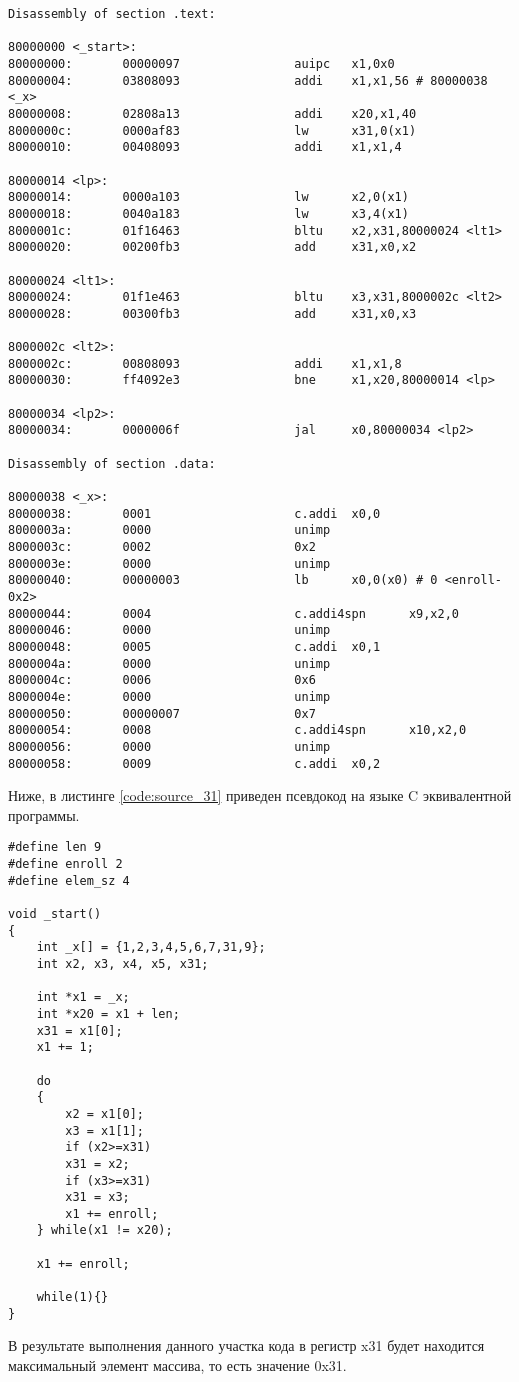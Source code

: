 \newpage
\begin{lstlisting}[label=code:source_21, caption=Деассемблированный листинг исходной программы]
Disassembly of section .text:

80000000 <_start>:
80000000:       00000097                auipc   x1,0x0
80000004:       03808093                addi    x1,x1,56 # 80000038 <_x>
80000008:       02808a13                addi    x20,x1,40
8000000c:       0000af83                lw      x31,0(x1)
80000010:       00408093                addi    x1,x1,4

80000014 <lp>:
80000014:       0000a103                lw      x2,0(x1)
80000018:       0040a183                lw      x3,4(x1)
8000001c:       01f16463                bltu    x2,x31,80000024 <lt1>
80000020:       00200fb3                add     x31,x0,x2

80000024 <lt1>:
80000024:       01f1e463                bltu    x3,x31,8000002c <lt2>
80000028:       00300fb3                add     x31,x0,x3

8000002c <lt2>:
8000002c:       00808093                addi    x1,x1,8
80000030:       ff4092e3                bne     x1,x20,80000014 <lp>

80000034 <lp2>:
80000034:       0000006f                jal     x0,80000034 <lp2>

Disassembly of section .data:

80000038 <_x>:
80000038:       0001                    c.addi  x0,0
8000003a:       0000                    unimp
8000003c:       0002                    0x2
8000003e:       0000                    unimp
80000040:       00000003                lb      x0,0(x0) # 0 <enroll-0x2>
80000044:       0004                    c.addi4spn      x9,x2,0
80000046:       0000                    unimp
80000048:       0005                    c.addi  x0,1
8000004a:       0000                    unimp
8000004c:       0006                    0x6
8000004e:       0000                    unimp
80000050:       00000007                0x7
80000054:       0008                    c.addi4spn      x10,x2,0
80000056:       0000                    unimp
80000058:       0009                    c.addi  x0,2
\end{lstlisting}

Ниже, в листинге \ref{code:source_31} приведен псевдокод на языке C эквивалентной программы.

\begin{lstlisting}[label=code:source_31, caption=Псевдокод на языке C эквивалентной программы]
#define len 9
#define enroll 2
#define elem_sz 4

void _start()
{
	int _x[] = {1,2,3,4,5,6,7,31,9};
	int x2, x3, x4, x5, x31;
	
	int *x1 = _x;
	int *x20 = x1 + len;
	x31 = x1[0];
	x1 += 1;
	
	do
	{
		x2 = x1[0];
		x3 = x1[1];
		if (x2>=x31)
		x31 = x2;
		if (x3>=x31)
		x31 = x3;
		x1 += enroll;
	} while(x1 != x20);
	
	x1 += enroll;
	
	while(1){}
}
\end{lstlisting}

В результате выполнения данного участка кода в регистр x31 будет находится максимальный элемент массива, то есть значение 0x31.
